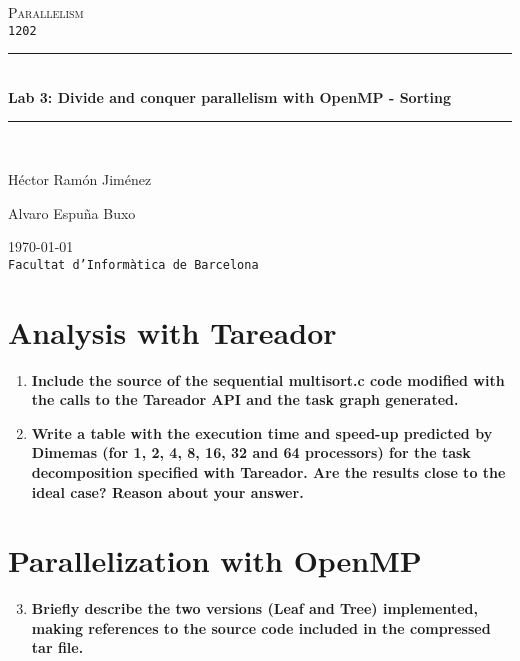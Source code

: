 \documentclass[a4paper,11pt]{article}
\begin{document}
\begin{titlepage}
\begin{center}
\textsc{\Large Parallelism}
\\
\texttt{1202}
\\[1.5cm]
\rule{\linewidth}{0.5mm}
\\[0.4cm]
{\huge
\bfseries
Lab 3: Divide and conquer parallelism with OpenMP - Sorting
\\[0.4cm]
}
\rule{\linewidth}{0.5mm}
\\[2.5cm]
\begin{minipage}{0.4\textwidth}
\begin{flushleft}
\large
Héctor Ramón Jiménez
\end{flushleft}
\end{minipage}
\begin{minipage}{0.4\textwidth}
\begin{flushright}
\large
Alvaro Espuña Buxo
\end{flushright}
\end{minipage}
\vfill
{\large
\today
}
\\
{\large
\texttt{Facultat d'Informàtica de Barcelona}
}
\end{center}
\end{titlepage}
\section{Analysis with Tareador}
\begin{enumerate}
\setcounter{enumi}{0}
\item
\textbf{Include the source of the sequential multisort.c code modified
  with the calls to the Tareador API and the task graph generated.}

\item
  \textbf{Write a table with the execution time and speed-up predicted
    by Dimemas (for 1, 2, 4, 8, 16, 32 and 64 processors) for the task
    decomposition specified with Tareador. Are the results close to the
    ideal case? Reason about your answer.}
\end{enumerate}

\section{Parallelization with OpenMP}
\begin{enumerate}
  \setcounter{enumi}{2}
  \item
    \textbf{ Briefly describe the two versions (Leaf and Tree)
      implemented, making references to the source code included in
      the compressed tar file.}
\end{enumerate}
\end{document}
